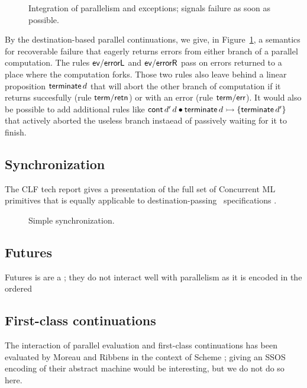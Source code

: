 \begin{figure}
\caption{Integration of parallelism and exceptions; signals failure as
  soon as possible.}
\label{fig:dest-fail-paror}
\end{figure}

By the destination-based parallel continuations, we give, in
Figure~\ref{fig:dest-fail-paror}, a semantics for recoverable failure
that eagerly returns errors from either branch of a parallel
computation. The rules ${\sf ev/errorL}$ and ${\sf ev/errorR}$ pass on
errors returned to a place where the computation forks.  Those two
rules also leave behind a linear proposition ${\sf terminate}\,d$ that
will abort the other branch of computation if it returns succesfully
(rule ${\sf term/retn}$) or with an error (rule ${\sf term/err}$). It
would also be possible to add additional rules like ${\sf cont}\,d'\,d
\mathbin{\bullet} {\sf terminate}\,d \rightarrowtail \{ {\sf terminate}\,d' \}$ that
actively aborted the useless branch instaead of passively waiting for
it to finish.

\subsection{Synchronization}
\label{sec:dest-synch}

The CLF tech report gives a presentation of the full set of Concurrent
ML primitives that is equally applicable to destination-passing
\sls~specifications \cite{cervesato02concurrent}.

\begin{figure}
\caption{Simple synchronization.}
\label{fig:dest-synch}
\end{figure}



\subsection{Futures}
\label{sec:dest-futures}

Futures is are a ; they do not interact well with parallelism as it is encoded
in the ordered 


\subsection{First-class continuations}
\label{sec:dest-continuations}

The interaction of parallel evaluation and first-class continuations
has been evaluated by Moreau and Ribbens in the context of Scheme
\cite{moreau96semantics}; giving an SSOS encoding of their abstract
machine would be interesting, but we do not do so here.


